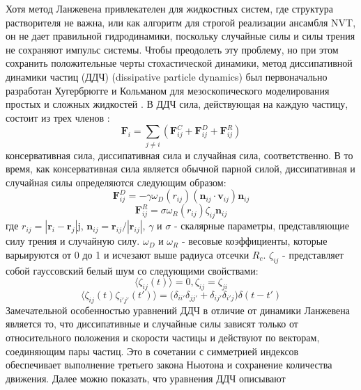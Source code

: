 Хотя метод Ланжевена привлекателен для жидкостных систем, где структура растворителя не важна, или как алгоритм для строгой реализации ансамбля NVT, он не дает правильной гидродинамики, поскольку случайные силы и силы трения не сохраняют импульс системы. Чтобы преодолеть эту проблему, но при этом сохранить положительные черты стохастической динамики, метод диссипативной динамики частиц (ДДЧ) (dissipative particle dynamics) был первоначально разработан Хугербрюгге и Кольманом для мезоскопического моделирования простых и сложных жидкостей \cite{hoogerbrugge_simulating_1992}. В ДДЧ сила, действующая на каждую частицу, состоит из трех членов \cite{moeendarbary_dissipative_2009}:
\begin{equation}
    {\mathbf F}_i= \sum_{j \neq i} ({\mathbf F}_{ij}^{C} + {\mathbf F}_{ij}^{D} +{\mathbf F}_{ij}^{R})
\end{equation}
консервативная сила, диссипативная сила и случайная сила, соответственно. В то время, как консервативная сила является обычной парной силой, диссипативная и случайная силы определяются следующим образом:
\begin{equation}
   {\mathbf F}_{ij}^{D} = -\gamma \omega_D (r_{ij})({\mathbf n}_{ij} \cdot {\mathbf v}_{ij}) {\mathbf n}_{ij}
\end{equation}
\begin{equation}
   {\mathbf F}_{ij}^{R}= \sigma \omega_R (r_{ij}) \zeta_{ij} {\mathbf n}_{ij}
\end{equation}
где $r_{ij}= |{\mathbf r}_i -{\mathbf r}_j|$j, ${\mathbf n}_{ij}= {\mathbf r}_{ij}/|{\mathbf r}_{ij}|$, $\gamma$ и $\sigma$ - скалярные параметры, представляющие силу трения и случайную силу. $\omega_D$ и $\omega_R$ - весовые коэффициенты, которые варьируются от 0 до 1 и исчезают выше радиуса отсечки $R_c$. $\zeta_{ij}$ - представляет собой гауссовский белый шум со следующими свойствами:
\begin{equation}
   \big\langle \zeta_{ij}(t) \big\rangle = 0, \zeta_{ij}=\zeta_{ji}
\end{equation}
\begin{equation}
    \big\langle \zeta_{ij}(t) \zeta_{i' j'}(t') \big \rangle= \big( \delta_{ii'}\delta_{jj'}+\delta_{ij'}\delta_{i'j} \big) \delta(t-t')
\end{equation}
Замечательной особенностью уравнений ДДЧ в отличие от динамики Ланжевена является то, что
диссипативные и случайные силы зависят только от относительного положения и скорости
частицы и действуют по векторам, соединяющим пары частиц. Это в сочетании с
симметрией индексов обеспечивает выполнение третьего закона Ньютона и сохранение количества движения. Далее можно показать, что уравнения ДДЧ описывают
